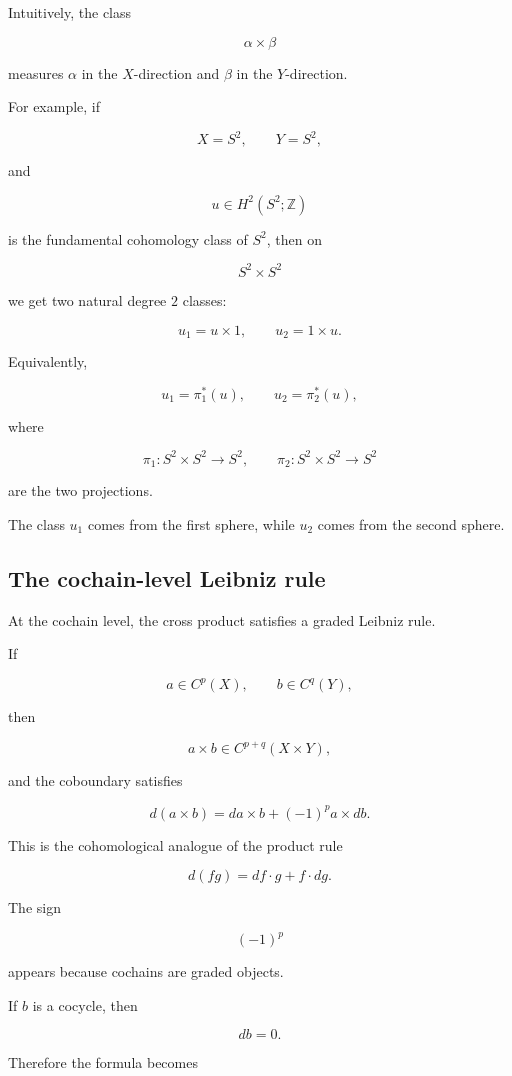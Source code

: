 \documentclass[12pt,a4paper]{article}
\theoremstyle{notespace}
\begin{document}
Intuitively, the class

\[
\alpha\times\beta
\]

measures \(\alpha\) in the \(X\)-direction and \(\beta\) in the \(Y\)-direction.

For example, if

\[
X=S^2,
\qquad
Y=S^2,
\]

and

\[
u\in H^2(S^2;\mathbb Z)
\]

is the fundamental cohomology class of \(S^2\), then on

\[
S^2\times S^2
\]

we get two natural degree \(2\) classes:

\[
u_1=u\times 1,
\qquad
u_2=1\times u.
\]

Equivalently,

\[
u_1=\pi_1^*(u),
\qquad
u_2=\pi_2^*(u),
\]

where

\[
\pi_1:S^2\times S^2\to S^2,
\qquad
\pi_2:S^2\times S^2\to S^2
\]

are the two projections.

The class \(u_1\) comes from the first sphere, while \(u_2\) comes from the second sphere.

\subsection{The cochain-level Leibniz rule}

At the cochain level, the cross product satisfies a graded Leibniz rule.

If

\[
a\in C^p(X),
\qquad
b\in C^q(Y),
\]

then

\[
a\times b\in C^{p+q}(X\times Y),
\]

and the coboundary satisfies

\[
\boxed{
	d(a\times b)
	=
	da\times b
	+
	(-1)^p a\times db.
}
\]

This is the cohomological analogue of the product rule

\[
d(fg)=df\cdot g+f\cdot dg.
\]

The sign

\[
(-1)^p
\]

appears because cochains are graded objects.

If \(b\) is a cocycle, then

\[
db=0.
\]

Therefore the formula becomes
\end{document}
